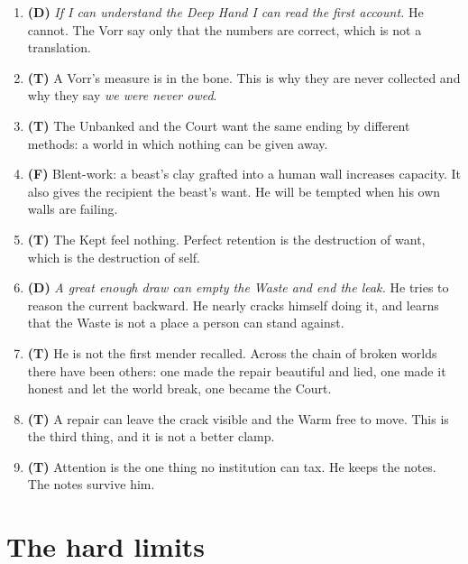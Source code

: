 \documentclass{design/chronicle}
\begin{document}
\begin{enumerate}[leftmargin=1.4em,itemsep=1pt,topsep=3pt,parsep=0pt]
\item \textbf{(D)} \emph{If I can understand the Deep Hand I can read the first account.} He cannot. The Vorr say only that the numbers are correct, which is not a translation.

\item \textbf{(T)} A Vorr’s measure is in the bone. This is why they are never collected and why they say \emph{we were never owed}.

\item \textbf{(T)} The Unbanked and the Court want the same ending by different methods: a world in which nothing can be given away.

\item \textbf{(F)} Blent-work: a beast’s clay grafted into a human wall increases capacity. It also gives the recipient the beast’s want. He will be tempted when his own walls are failing.

\item \textbf{(T)} The Kept feel nothing. Perfect retention is the destruction of want, which is the destruction of self.

\item \textbf{(D)} \emph{A great enough draw can empty the Waste and end the leak.} He tries to reason the current backward. He nearly cracks himself doing it, and learns that the Waste is not a place a person can stand against.

\item \textbf{(T)} He is not the first mender recalled. Across the chain of broken worlds there have been others: one made the repair beautiful and lied, one made it honest and let the world break, one became the Court.

\item \textbf{(T)} A repair can leave the crack visible and the Warm free to move. This is the third thing, and it is not a better clamp.

\item \textbf{(T)} Attention is the one thing no institution can tax. He keeps the notes. The notes survive him.

\end{enumerate}

\section*{The hard limits}
\end{document}
